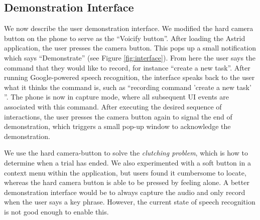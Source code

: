 \documentclass[letterpaper]{article}
\newcommand{\remove}[1]{}
\begin{document}
\remove{Recording demonstrations at this low-level is the source of some errors. For instance, imagine
the user demonstrates how to click the 'save' button on a screen with a list. If the user later adds elements to the
list and tries to play back the 'save' command, the button might have moved. This is a large source of error in 
our experiments.}



\subsection{Demonstration Interface}
We now describe the user demonstration interface. We modified the hard camera button on the phone to serve as the 
``Voicify button''. After loading the Astrid application, the user presses the camera button. This pops up a small
notification which says ``Demonstrate'' (see Figure \ref{fig:interface}). From here the user says the command that they would like to record,
for instance ``create a new task''.
After running Google-powered speech recognition, the interface speaks back to the user what it thinks the command
is, such as ``recording command 'create a new task' ''. The phone is now in capture mode, where all subsequent
UI events are associated with this command. After executing the desired sequence of interactions, the user presses the camera button again 
to signal the end of demonstration, which triggers a small pop-up window
to acknowledge the demonstration.

We use the hard camera-button to solve the \emph{clutching problem}, which is how to determine when a trial has ended.
We also experimented with a soft button in a context menu within the application, but users found it cumbersome
to locate, whereas the hard camera button is able to be pressed by feeling alone.
A better demonstration interface would be to always capture the audio and only record when the
user says a key phrase. However, the current state of speech recognition is not good enough to enable this.
\end{document}
